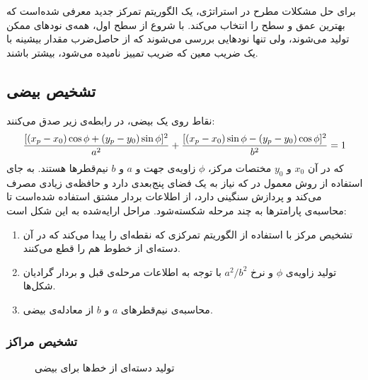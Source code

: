 \documentclass[12pt,a4paper]{article}
\numberwithin{equation}{section}
\numberwithin{figure}{section}
\theoremstyle{definition}
\theoremstyle{theorem}
\theoremstyle{definition}
\begin{document}
برای حل مشکلات مطرح در استراتژی، یک الگوریتم تمرکز جدید معرفی شده‌است که بهترین عمق و سطح را انتخاب می‌کند. با شروع از سطح اول، همه‌ی نودهای ممکن تولید می‌شوند، ولی تنها نودهایی بررسی می‌شوند که از حاصل‌ضرب مقدار بیشینه با یک ضریب معین که ضریب تمییز نامیده می‌شود، بیشتر باشند. 

\subsection{تشخیص بیضی}

نقاط روی یک بیضی، در رابطه‌ی زیر صدق می‌کنند: 
\begin{align}
{{ [ (x_p - x_0 ) \cos\phi + (y_p - y_0 ) \sin\phi ]^2 } \over {a^2} } + { { [ (x_p - x_0 ) \sin\phi - (y_p - y_0 ) \cos\phi ]^2 } \over {b^2} }= 1
\end{align}
که در آن
\( x_0 \) 
و 
\( y_0 \) 
مختصات مرکز،
\( \phi \) 
زاویه‌ی جهت و 
\( a \)
و 
\( b \)
نیم‌قطرها هستند. به جای استفاده از روش معمول در  که نیاز به یک فضای پنج‌بعدی دارد و حافظه‌ی زیادی مصرف می‌کند و پردازش سنگینی دارد، از اطلاعات بردار مشتق استفاده شده‌است تا محاسبه‌ی پارامترها به چند مرحله شکسته‌شود. مراحل ارایه‌شده به این شکل است: 
\begin{enumerate}
\item 
تشخیص مرکز با استفاده از الگوریتم تمرکزی که نقطه‌ای را پیدا می‌کند که در آن دسته‌ای از خطوط هم را قطع می‌کنند.

\item
تولید زاویه‌ی 
\( \phi \) 
و نرخ 
\( a^2/b^2 \) 
با توجه به اطلاعات مرحله‌ی قبل و بردار گرادیان شکل‌ها. 

\item 
محاسبه‌ی نیم‌قطرهای 
\( a \)
و 
\( b \)
از معادله‌ی بیضی. 

\end{enumerate}


\subsubsection{تشخیص مراکز}
\label{subsec:centers}
\begin{figure}[h]
\centering
{}
\caption{تولید دسته‌ای از خط‌ها برای بیضی \cite{FEHT} }
\label{fig:lineBeam}
\end{figure}
\end{document}
